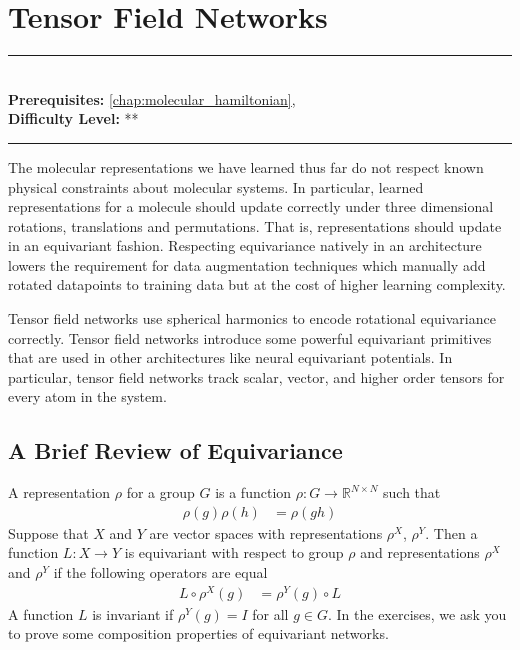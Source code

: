 \documentclass[book.tex]{subfiles}
\begin{document}
\chapter{Tensor Field Networks}
\label{chap:neural_equivariant_potentials}
\noindent\rule{11cm}{0.4pt} \\
\textbf{Prerequisites:}  \autoref{chap:molecular_hamiltonian},   \\
\textbf{Difficulty Level:} ** \\
\noindent\rule{11cm}{0.4pt}
\vspace{5mm}

The molecular representations we have learned thus far do not respect known physical constraints about molecular systems. In particular, learned representations for a molecule should update correctly under three dimensional rotations, translations and permutations. That is, representations should update in an equivariant fashion. Respecting equivariance natively in an architecture lowers the requirement for data augmentation techniques which manually add rotated datapoints to training data but at the cost of higher learning complexity. 

Tensor field networks \cite{thomas2018tensor} use spherical harmonics to encode rotational equivariance correctly. Tensor field networks introduce some powerful equivariant primitives that are used in other architectures like neural equivariant potentials. In particular, tensor field networks track scalar, vector, and higher order tensors for every atom in the system.


\section{A Brief Review of Equivariance}

A representation $\rho$ for a group $G$ is a function $\rho: G \to \mathbb{R}^{N \times N}$ such that
\begin{align}
    \rho(g)\rho(h) &= \rho(gh)
\end{align}
Suppose that $X$ and $Y$ are vector spaces with representations $\rho^X$, $\rho^Y$. Then a function $L: X \to Y$ is equivariant with respect to group $\rho$ and representations $\rho^X$ and $\rho^Y$ if the following operators are equal
\begin{align}
L \circ \rho^X(g) &= \rho^Y(g) \circ L
\end{align}
A function $L$ is invariant if $\rho^Y(g) = I$ for all $g \in G$. In the exercises, we ask you to prove some composition properties of equivariant networks.
\end{document}

